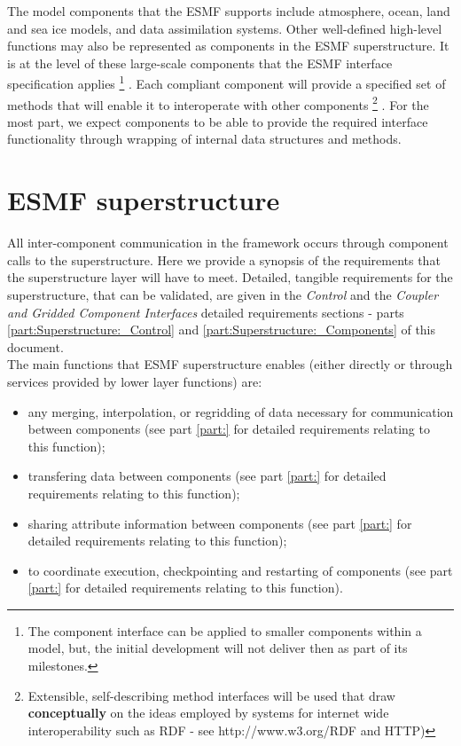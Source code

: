 The model components that the ESMF supports include atmosphere, ocean,
land and sea ice models, and data assimilation systems. Other
well-defined high-level functions may also be represented as
components in the ESMF superstructure.  It is at the level of these
large-scale components that the ESMF interface specification applies
\footnote{
The component interface can be applied to smaller components within a model,
but, the initial development will not deliver then as part of its milestones.
}
.
Each compliant component will provide a specified set of methods that
will enable it to interoperate with other components \footnote{
Extensible, self-describing method interfaces will be used that draw
{\bf conceptually} on the ideas employed by systems for internet
wide interoperability such as RDF - see http://www.w3.org/RDF and HTTP)
}
.  For the most
part, we expect components to be able to provide the required
interface functionality through wrapping of internal data structures
and methods. 

\section{ESMF superstructure}
\label{sec:ESMF_superstructure}

All inter-component communication in the framework occurs through 
component calls to the superstructure. Here we provide a synopsis of the
requirements that the superstructure layer will have to meet.
Detailed, tangible requirements for the superstructure, that can
be validated, are given in the {\it Control} and the {\it Coupler and
Gridded Component Interfaces} detailed requirements sections -
parts \ref{part:Superstructure:_Control} and \ref{part:Superstructure:_Components} of this document. \\

\noindent The main functions that ESMF superstructure enables (either
directly or through services provided by lower layer functions) are:

\begin{itemize}
\item any merging, interpolation, or regridding 
of data necessary for communication between components
(see part \ref{part:} for detailed requirements relating
to this function);
\item transfering data between components (see part \ref{part:} for detailed 
requirements relating to this function);
\item sharing attribute information between components
(see part \ref{part:} for detailed requirements relating
to this function);
\item to coordinate execution, checkpointing and restarting of
  components (see part \ref{part:} for detailed 
requirements relating to this function).
\end{itemize}

